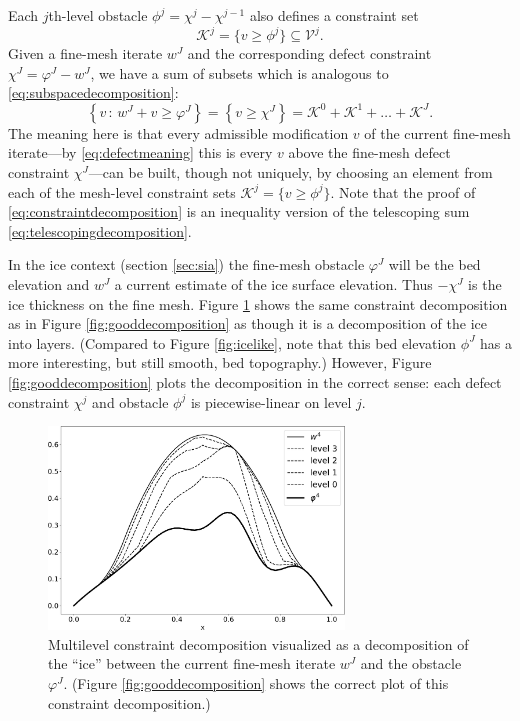 \documentclass[letterpaper,final,12pt,reqno]{amsart}
\theoremstyle{claim}
\numberwithin{equation}{section}
\numberwithin{figure}{section}
\numberwithin{table}{section}
\begin{document}
Each $j$th-level obstacle $\phi^j = \chi^j - \chi^{j-1}$ also defines a constraint set
\begin{equation}
  \mathcal{K}^j = \{v \ge \phi^j\} \subseteq \mathcal{V}^j.  \label{eq:levelconstraint}
\end{equation}
Given a fine-mesh iterate $w^J$ and the corresponding defect constraint $\chi^J = \varphi^J - w^J$, we have a sum of subsets which is analogous to \eqref{eq:subspacedecomposition}:
\begin{equation}
  \left\{v\,:\,w^J + v \ge \varphi^J\right\} = \left\{v \ge \chi^J\right\} = \mathcal{K}^0 + \mathcal{K}^1 + \dots + \mathcal{K}^J. \label{eq:constraintdecomposition}
\end{equation}
The meaning here is that every admissible modification $v$ of the current fine-mesh iterate---by \eqref{eq:defectmeaning} this is every $v$ above the fine-mesh defect constraint $\chi^J$---can be built, though not uniquely, by choosing an element from each of the mesh-level constraint sets $\mathcal{K}^j = \{v \ge \phi^j\}$.  Note that the proof of \eqref{eq:constraintdecomposition} is an inequality version of the telescoping sum \eqref{eq:telescopingdecomposition}.

In the ice context (section \ref{sec:sia}) the fine-mesh obstacle $\varphi^J$ will be the bed elevation and $w^J$ a current estimate of the ice surface elevation.  Thus $-\chi^J$ is the ice thickness on the fine mesh.  Figure \ref{fig:icelikedecomposition} shows the same constraint decomposition as in Figure \ref{fig:gooddecomposition} as though it is a decomposition of the ice into layers.  (Compared to Figure \ref{fig:icelike}, note that this bed elevation $\phi^J$ has a more interesting, but still smooth, bed topography.)  However, Figure \ref{fig:gooddecomposition} plots the decomposition in the correct sense: each defect constraint $\chi^j$ and obstacle $\phi^j$ is piecewise-linear on level $j$.

\begin{figure}
\includegraphics[width=0.7\textwidth]{fixfigs/icedec_defect.pdf}
\caption{Multilevel constraint decomposition visualized as a decomposition of the ``ice'' between the current fine-mesh iterate $w^J$ and the obstacle $\varphi^J$.  (Figure \ref{fig:gooddecomposition} shows the correct plot of this constraint decomposition.)}
\label{fig:icelikedecomposition}
\end{figure}
\end{document}
